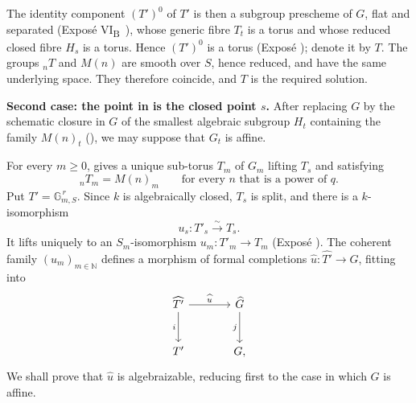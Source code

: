 The identity component \((T')^0\) of \(T'\) is then a subgroup
prescheme of \(G\), flat and separated (Exposé
VI\textsubscript{B}~), whose generic fibre \(T_t\) is a torus and
whose reduced closed fibre \(H_s\) is a torus. Hence \((T')^0\) is a
torus (Exposé ); denote it by \(T\). The groups \({}_nT\) and
\(M(n)\) are smooth over \(S\), hence reduced, and have the same
underlying space. They therefore coincide, and \(T\) is the required
solution.

\smallskip\noindent
\textbf{Second case: the point in  is the closed point
\(s\).}
After replacing \(G\) by the schematic closure in \(G\) of the
smallest algebraic subgroup \(H_t\) containing the family \(M(n)_t\)
(), we may suppose that \(G_t\) is affine.

For every \(m\geq0\),  gives a unique sub-torus \(T_m\)
of \(G_m\) lifting \(T_s\) and satisfying
\[
  {}_nT_m=M(n)_m
  \qquad\text{for every }n\text{ that is a power of }q.
\]
Put \(T'=\mathbb G_{m,S}^{\,r}\). Since \(k\) is algebraically
closed, \(T_s\) is split, and there is a \(k\)-isomorphism
\[
  u_s:T'_s\xrightarrow{\sim}T_s.
\]
It lifts uniquely to an \(S_m\)-isomorphism
\(u_m:T'_m\to T_m\) (Exposé ). The coherent family
\((u_m)_{m\in\mathbb N}\) defines a morphism of formal completions
\(\widehat u:\widehat{T'}\to\widehat G\), fitting into
\[
\begin{tikzcd}[column sep=large,row sep=large]
\widehat{T'} \arrow[r,"\widehat u"] \arrow[d,"i"'] &
  \widehat G \arrow[d,"j"'] \\
T' & G ,
\end{tikzcd}
\]
We shall prove that \(\widehat u\) is algebraizable, reducing first
to the case in which \(G\) is affine.


